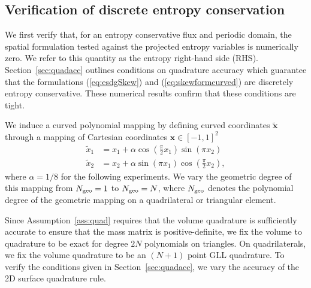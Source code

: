 \documentclass{svjour3}                     %
\renewcommand{\tilde}{\widetilde}
\newcommand{\LRp}[1]{\left( #1 \right)}
\renewcommand{\note}[1]{{\color{blue}{#1}}}
\begin{document}

\subsection{Verification of discrete entropy conservation}

We first verify that, for an entropy conservative flux and periodic domain, the spatial formulation tested against the projected entropy variables is numerically zero.  We refer to this quantity as the entropy right-hand side (RHS).   Section~\ref{sec:quadacc} outlines conditions on quadrature accuracy which guarantee that the formulations (\ref{eq:esdgSkew}) and (\ref{eq:skewformcurved}) are discretely entropy conservative.  These numerical results confirm that these conditions are tight.  

We induce a curved polynomial mapping by defining curved coordinates $\tilde{\bm{x}}$ through a mapping of Cartesian coordinates $\bm{x} \in [-1,1]^2$ 
\begin{align*}
\tilde{x}_1 &= x_1 + \alpha \cos\LRp{\frac{\pi}{2}x_1}\sin\LRp{\pi x_2}\\
\tilde{x}_2 &= x_2 + \alpha \sin\LRp{{\pi}x_1}\cos\LRp{\frac{\pi}{2} x_2},
\end{align*}
where $\alpha = 1/8$ for the following experiments.  We vary the geometric degree of this mapping from $N_{\rm geo} = 1$ to $N_{\rm geo} = N$, where $N_{\rm geo}$ denotes the polynomial degree of the geometric mapping on a quadrilateral or triangular element.  

Since Assumption~\ref{ass:quad} requires that the volume quadrature is sufficiently accurate to ensure that the mass matrix is positive-definite, we fix the volume to quadrature to be exact for degree $2N$ polynomials on triangles.  On quadrilaterals, we fix the volume quadrature to be an $(N+1)$ point GLL quadrature.  To verify the conditions given in Section~\ref{sec:quadacc}, we vary the accuracy of the 2D surface quadrature rule.  
\end{document}
